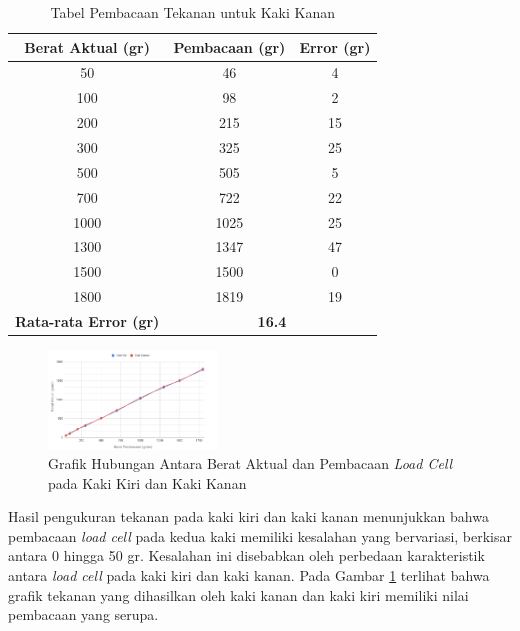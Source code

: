 \begin{enumerate}[label=\Alph*.]
        \begin{table}[h!]
            \centering
            \caption{Tabel Pembacaan Tekanan untuk Kaki Kanan}
            \begin{tabular}{|c|c|c|}
                \hline
                \textbf{Berat Aktual (gr)} & \textbf{Pembacaan (gr)} & \textbf{Error (gr)} \\
                \hline
                50    & 46    & 4    \\
                100   & 98    & 2    \\
                200   & 215   & 15   \\
                300   & 325   & 25   \\
                500   & 505   & 5    \\
                700   & 722   & 22   \\
                1000  & 1025  & 25   \\
                1300  & 1347  & 47   \\
                1500  & 1500  & 0    \\
                1800  & 1819  & 19   \\
                \hline
                \textbf{Rata-rata Error (gr)} & \multicolumn{2}{c|}{\textbf{16.4}} \\
                \hline
            \end{tabular}
            \label{tab:pengukuran_berat_kaki_kanan}
        \end{table}

        \begin{figure}[h]
            \centering
            \includegraphics[width=0.4\textwidth]{gambar/chart_tekanan_kaki.png}
            \caption{Grafik Hubungan Antara Berat Aktual dan Pembacaan \emph{Load Cell} pada Kaki Kiri dan Kaki Kanan}
            \label{fig:tekanan_kaki}
        \end{figure}

        \hspace*{1em} Hasil pengukuran tekanan pada kaki kiri dan kaki kanan menunjukkan bahwa pembacaan \emph{load cell} pada kedua kaki memiliki kesalahan yang bervariasi, berkisar antara 0 hingga 50 gr. Kesalahan ini disebabkan oleh perbedaan karakteristik antara \emph{load cell} pada kaki kiri dan kaki kanan. Pada Gambar \ref{fig:tekanan_kaki} terlihat bahwa grafik tekanan yang dihasilkan oleh kaki kanan dan kaki kiri memiliki nilai pembacaan yang serupa.


\end{enumerate}
